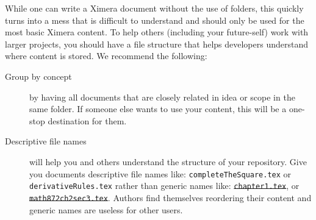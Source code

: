 \documentclass{ximera}
\begin{document}
While one can write a Ximera document without the use of folders, this quickly
turns into a mess that is difficult to understand and should only be used for
the most basic Ximera content.
To help others (including your future-self) work with larger projects, you
should have a file structure
that helps developers understand where content is stored. We recommend the
following:
\begin{description}
  \item[Group by concept] by having all documents that are closely related in
    idea
    or scope in the same folder. If someone else wants to use your content,
    this will be a one-stop destination for them.
  \item[Descriptive file names] will help you and others understand the
    structure of your repository. Give you documents descriptive file names like:
    \verb!completeTheSquare.tex! or \verb!derivativeRules.tex! rather than
    generic
    names like: \sout{\texttt{chapter1.tex}}, or
    \sout{\texttt{math872ch2sec3.tex}}. Authors find themselves reordering
    their content and generic names are useless for other users.
\end{description}
\end{document}
